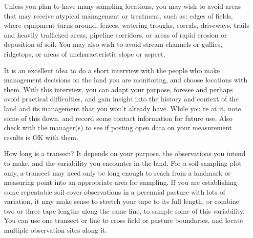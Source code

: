 \documentclass[11pt,letterpaper,twoside,onecolumn]{memoir}
\begin{document}
Unless you plan to have many sampling locations, you may wish to avoid areas that may receive atypical management or treatment, such as: edges of fields, where equipment turns around, fences, watering troughs, corrals, driveways, trails and heavily trafficked areas, pipeline corridors, or areas of rapid erosion or deposition of soil. You may also wish to avoid stream channels or gullies, ridgetops, or areas of uncharacteristic slope or aspect.

It is an excellent idea to do a short interview with the people who make management decisions on the land you are monitoring, and choose locations with them. With this interview, you can adapt your purpose, foresee and perhaps avoid practical difficulties, and gain insight into the history and context of the land and its management that you won't already have. While you're at it, note some of this down, and record some contact information for future use. Also check with the manager(s) to see if posting open data on your measurement results is OK with them.

How long is a transect? It depends on your purpose, the observations you intend to make, and the variability you encounter in the land. For a soil sampling plot only, a transect may need only be long enough to reach from a landmark or measuring point into an appropriate area for sampling. If you are establishing some repeatable soil cover observations in a perennial pasture with lots of variation, it may make sense to stretch your tape to its full length, or combine two or three tape lengths along the same line, to sample some of this variability. You can use one transect or line to cross field or pasture boundaries, and locate multiple observation sites along it.
\end{document}
